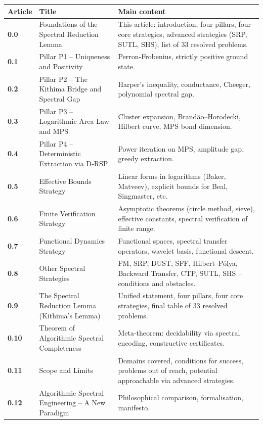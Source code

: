 \documentclass[11pt,a4paper]{article}
\begin{document}
\begin{center}
\small
\begin{tabular}{@{}>{\bfseries}l>{\raggedright\arraybackslash}p{4.5cm}>{\raggedright\arraybackslash}p{6cm}@{}}
\toprule
\textbf{Article} & \textbf{Title} & \bfseries Main content \\
\midrule
0.0 & Foundations of the Spectral Reduction Lemma & This article: introduction, four pillars, four core strategies, advanced strategies (SRP, SUTL, SHS), list of 33 resolved problems. \\
0.1 & Pillar P1 – Uniqueness and Positivity & Perron‑Frobenius, strictly positive ground state. \\
0.2 & Pillar P2 – The Kithima Bridge and Spectral Gap & Harper's inequality, conductance, Cheeger, polynomial spectral gap. \\
0.3 & Pillar P3 – Logarithmic Area Law and MPS & Cluster expansion, Brandão–Horodecki, Hilbert curve, MPS bond dimension. \\
0.4 & Pillar P4 – Deterministic Extraction via D‑RSP & Power iteration on MPS, amplitude gap, greedy extraction. \\
0.5 & Effective Bounds Strategy & Linear forms in logarithms (Baker, Matveev), explicit bounds for Beal, Singmaster, etc. \\
0.6 & Finite Verification Strategy & Asymptotic theorems (circle method, sieve), effective constants, spectral verification of finite range. \\
0.7 & Functional Dynamics Strategy & Functional spaces, spectral transfer operators, wavelet basis, functional descent. \\
0.8 & Other Spectral Strategies & FM, SRP, DUST, SFF, Hilbert–Pólya, Backward Transfer, CTP, SUTL, SHS – conditions and obstacles. \\
0.9 & The Spectral Reduction Lemma (Kithima's Lemma) & Unified statement, four pillars, four core strategies, final table of 33 resolved problems. \\
0.10 & Theorem of Algorithmic Spectral Completeness & Meta‑theorem: decidability via spectral encoding, constructive certificates. \\
0.11 & Scope and Limits & Domains covered, conditions for success, problems out of reach, potential approachable via advanced strategies. \\
0.12 & Algorithmic Spectral Engineering – A New Paradigm & Philosophical comparison, formalisation, manifesto. \\
\bottomrule
\end{tabular}
\normalsize
\end{center}
\end{document}
